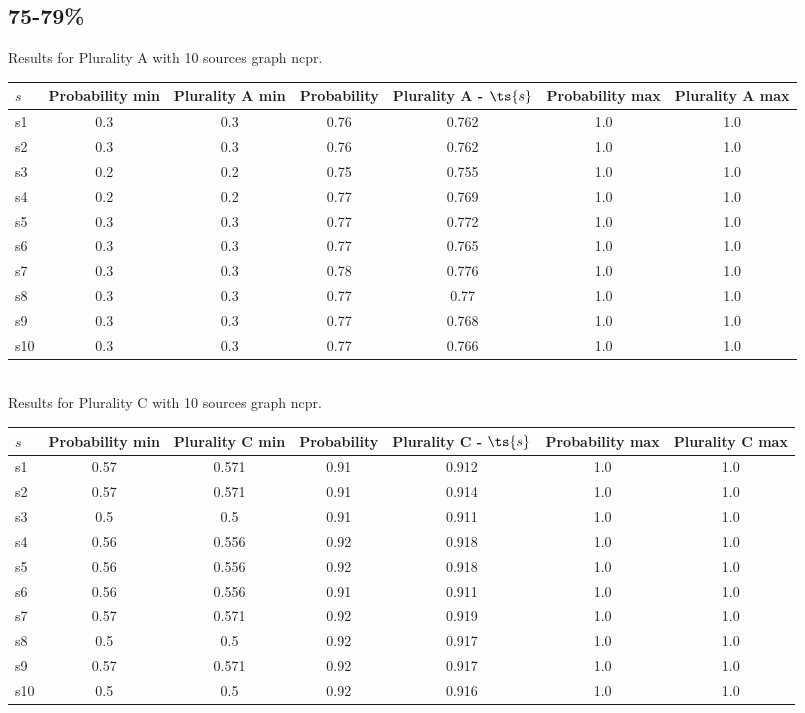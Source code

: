 \documentclass{article}
\begin{document}
\newpage

\subsection{75-79\%}

\noindent Results for Plurality A with 10 sources graph ncpr.

\noindent\begin{tabular}{|l|c|c|c|c|c|c|}
\hline
$s$& Probability min & Plurality A min & Probability & Plurality A - $\ts{s}$ & Probability max & Plurality A max\\
\hline
s1 &0.3 & 0.3 & 0.76 & 0.762 & 1.0 & 1.0\\
\hline
s2 &0.3 & 0.3 & 0.76 & 0.762 & 1.0 & 1.0\\
\hline
s3 &0.2 & 0.2 & 0.75 & 0.755 & 1.0 & 1.0\\
\hline
s4 &0.2 & 0.2 & 0.77 & 0.769 & 1.0 & 1.0\\
\hline
s5 &0.3 & 0.3 & 0.77 & 0.772 & 1.0 & 1.0\\
\hline
s6 &0.3 & 0.3 & 0.77 & 0.765 & 1.0 & 1.0\\
\hline
s7 &0.3 & 0.3 & 0.78 & 0.776 & 1.0 & 1.0\\
\hline
s8 &0.3 & 0.3 & 0.77 & 0.77 & 1.0 & 1.0\\
\hline
s9 &0.3 & 0.3 & 0.77 & 0.768 & 1.0 & 1.0\\
\hline
s10 &0.3 & 0.3 & 0.77 & 0.766 & 1.0 & 1.0\\
\hline
\end{tabular}\\

\noindent Results for Plurality C with 10 sources graph ncpr.

\noindent\begin{tabular}{|l|c|c|c|c|c|c|}
\hline
$s$& Probability min & Plurality C min & Probability & Plurality C - $\ts{s}$ & Probability max & Plurality C max\\
\hline
s1 &0.57 & 0.571 & 0.91 & 0.912 & 1.0 & 1.0\\
\hline
s2 &0.57 & 0.571 & 0.91 & 0.914 & 1.0 & 1.0\\
\hline
s3 &0.5 & 0.5 & 0.91 & 0.911 & 1.0 & 1.0\\
\hline
s4 &0.56 & 0.556 & 0.92 & 0.918 & 1.0 & 1.0\\
\hline
s5 &0.56 & 0.556 & 0.92 & 0.918 & 1.0 & 1.0\\
\hline
s6 &0.56 & 0.556 & 0.91 & 0.911 & 1.0 & 1.0\\
\hline
s7 &0.57 & 0.571 & 0.92 & 0.919 & 1.0 & 1.0\\
\hline
s8 &0.5 & 0.5 & 0.92 & 0.917 & 1.0 & 1.0\\
\hline
s9 &0.57 & 0.571 & 0.92 & 0.917 & 1.0 & 1.0\\
\hline
s10 &0.5 & 0.5 & 0.92 & 0.916 & 1.0 & 1.0\\
\hline
\end{tabular}\\
\end{document}
